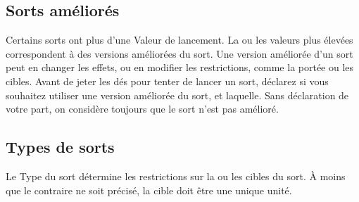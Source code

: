 \subsection{Sorts améliorés}
\label{boosted_spells}

Certains sorts ont plus d'une Valeur de lancement. La ou les valeurs plus élevées correspondent à des versions améliorées du sort. Une version améliorée d'un sort peut en changer les effets, ou en modifier les restrictions, comme la portée ou les cibles. Avant de jeter les dés pour tenter de lancer un sort, déclarez si vous souhaitez utiliser une version améliorée du sort, et laquelle. Sans déclaration de votre part, on considère toujours que le sort n'est pas amélioré.

\subsection{Types de sorts}
\label{spell_types}

Le Type du sort détermine les restrictions sur la ou les cibles du sort. À moins que le contraire ne soit précisé, la cible doit être une unique unité.

\paragraph{\augment}


\paragraph{\aura}


\paragraph{\damage}


\paragraph{\direct}

